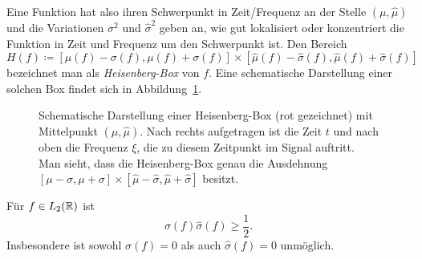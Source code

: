 \begin{remark}
Eine Funktion hat also ihren Schwerpunkt in Zeit/Frequenz an der Stelle $ (\mu, \widehat{\mu}) $
und die Variationen $ \sigma^{2} $ und $ \widehat{\sigma}^{2} $ geben an, wie gut lokalisiert oder
konzentriert die Funktion in Zeit und Frequenz um den Schwerpunkt ist. Den Bereich
\[
  H(f) \coloneqq 
    [\mu(f) - \sigma(f), \mu(f) + \sigma(f)] \times
    [\widehat{\mu}(f) - \widehat{\sigma}(f), \widehat{\mu}(f) + \widehat{\sigma}(f)]
\]
bezeichnet man als \emph{Heisenberg-Box} von $ f $. Eine schematische Darstellung einer solchen
Box findet sich in Abbildung~\ref{fig:Heisenberg-Box}.

\begin{figure}[ht]
\centering
{}
\caption{Schematische Darstellung einer Heisenberg-Box (rot gezeichnet) mit Mittelpunkt
  $ (\mu, \widehat{\mu}) $. Nach rechts aufgetragen ist die Zeit $ t $ und nach oben die Frequenz
  $ \xi $, die zu diesem Zeitpunkt im Signal auftritt. Man sieht, dass die Heisenberg-Box genau die
  Ausdehnung $ [\mu - \sigma, \mu + \sigma] \times
  [\widehat{\mu} - \widehat{\sigma}, \widehat{\mu} + \widehat{\sigma}] $ besitzt.}
\label{fig:Heisenberg-Box}
\end{figure}
\end{remark}

\begin{proposition}
Für $ f \in L_{2}(\mathbb{R}) $ ist
\[
  \sigma(f)\widehat{\sigma}(f) \geq \frac{1}{2}.
\]
Insbesondere ist sowohl $ \sigma(f) = 0 $ als auch $ \widehat{\sigma}(f) = 0 $ unmöglich.
\end{proposition}

